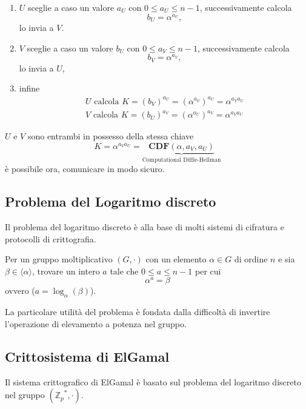 \begin{enumerate}
    \item $U$ sceglie a caso un valore $a_{U}$ con $0 \leq a_{U} \leq n-1$, successivamente calcola 
    \[
        b_{U} = \alpha^{a_{U}},
    \] lo invia a $V$.
    \item $V$ sceglie a caso un valore $b_{U}$ con $0 \leq a_{V} \leq n-1$, successivamente calcola
    \[
        b_{V} = \alpha^{a_{V}},
    \] lo invia a $U$,
    \item infine
    \begin{align*}
        U \text{ calcola } K = (b_V)^{a_U} = (\alpha^{a_V})^{a_U} = \alpha^{a_V a_U}\\    
        V \text{ calcola } K = (b_U)^{a_V} = (\alpha^{a_U})^{a_V} = \alpha^{a_V a_U}    
    \end{align*}
\end{enumerate}
$U$ e $V$ sono entrambi in possesso della stessa chiave 
\[
    K = \alpha^{a_V a_U} = \underbrace{\textbf{CDF}(\alpha,a_V,a_U)}_{\text{Computational Diffie-Hellman}} 
\] è possibile ora, comunicare in modo sicuro. 

\subsection{Problema del Logaritmo discreto}
Il problema del logaritmo discreto è alla base di molti sistemi di cifratura e protocolli di crittografia.


\begin{definition}
    Per un gruppo moltiplicativo $(G,\cdot)$ con un elemento $\alpha \in G$ di ordine $n$ e sia $\beta \in \langle \alpha \rangle$, trovare un intero $a$ tale che $0 \leq a \leq n-1$ per cui 
    \[
        \alpha^{a} = \beta
    \]
    ovvero ($a = \log_{\alpha}(\beta)$).
\end{definition}

\vspace{1em}
La particolare utilità del problema è fondata dalla difficoltà di invertire l'operazione di elevamento a potenza nel gruppo.

\subsection{Crittosistema di ElGamal}
Il sistema crittografico di ElGamal è basato sul problema del logaritmo discreto nel gruppo $({\mathbb{Z}_p}^*,\cdot)$.

